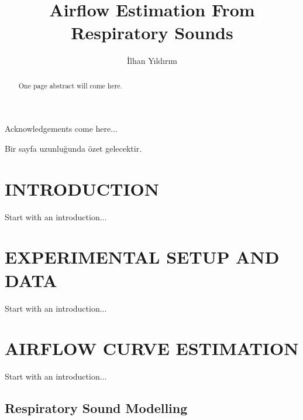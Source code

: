 \documentclass[a4paper,onesided,12pt]{report}
\title{Airflow Estimation From Respiratory Sounds}
\author{İlhan Yıldırım}
\begin{document}
\makemstitle %
\makeapprovalpage
\begin{acknowledgements}
Acknowledgements come here...
\end{acknowledgements}
\begin{abstract}
One page abstract will come here.  
\end{abstract}
\begin{ozet}
Bir sayfa uzunluğunda özet gelecektir.
\end{ozet}
\tableofcontents
\listoffigures
\listoftables
\begin{symbols}
%

\sym{}{}
\sym{ }{}

\end{symbols}

\begin{abbreviations}
\end{abbreviations}


\chapter{INTRODUCTION}
\label{chapter:introduction}
Start with an introduction...

\chapter{EXPERIMENTAL SETUP AND DATA}
\label{chapter:introduction}
Start with an introduction...

%
\chapter{AIRFLOW CURVE ESTIMATION}
\label{chapter:airflow-curve-estimation}
Start with an introduction...
\section{Respiratory Sound Modelling}
\end{document}
